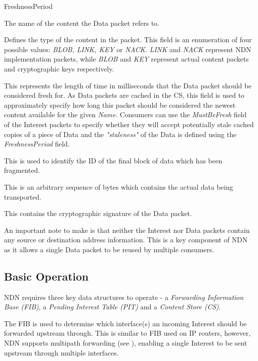 \begin{labeling}{FreshnessPeriod }
    \item [Name] The name of the content the Data packet refers to.
    \item [ContentType] Defines the type of the content in the packet. This field is an enumeration of four possible values: \textit{BLOB, LINK, KEY} or \textit{NACK}. \textit{LINK} and \textit{NACK} represent NDN implementation packets, while \textit{BLOB} and \textit{KEY} represent actual content packets and cryptographic keys respectively.
    \item [FreshnessPeriod] This represents the length of time in milliseconds that the Data packet should be considered fresh for. As Data packets are cached in the CS, this field is used to approximately specify how long this packet should be considered the newest content available for the given \textit{Name}. Consumers can use the \textit{MustBeFresh} field of the Interest packets to specify whether they will accept potentially stale cached copies of a piece of Data and the \textit{"staleness"} of the Data is defined using the \textit{FreshnessPeriod} field.
    \item [FinalBlockId] This is used to identify the ID of the final block of data which has been fragmented.
    \item [Content] This is an arbitrary sequence of bytes which contains the actual data being transported.
    \item [Signature] This contains the cryptographic signature of the Data packet.
\end{labeling}

An important note to make is that neither the Interest nor Data packets contain any source or destination address information. This is a key component of NDN as it allows a single Data packet to be reused by multiple consumers. 

\subsection{Basic Operation}\label{sec:ndn-basic-operation}
NDN requires three key data structures to operate - a \textit{Forwarding Information Base (FIB)}, a \textit{Pending Interest Table (PIT)} and a \textit{Content Store (CS)}. 

The FIB is used to determine which interface(s) an incoming Interest should be forwarded upstream through. This is similar to FIB used on IP routers, however, NDN supports multipath forwarding (see ), enabling a single Interest to be sent upstream through multiple interfaces. 

